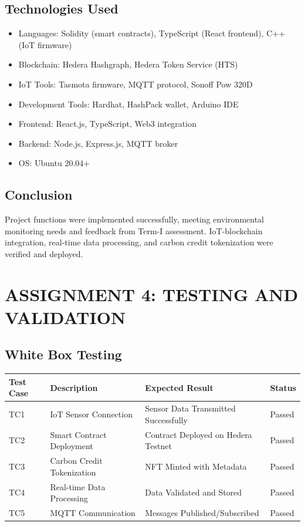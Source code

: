 \documentclass[oneside,a4paper,12pt]{book}
\begin{document}
\begin{appendices}
\subsection{Technologies Used}
\begin{itemize}
    \item Languages: Solidity (smart contracts), TypeScript (React frontend), C++ (IoT firmware)
    \item Blockchain: Hedera Hashgraph, Hedera Token Service (HTS)
    \item IoT Tools: Tasmota firmware, MQTT protocol, Sonoff Pow 320D
    \item Development Tools: Hardhat, HashPack wallet, Arduino IDE
    \item Frontend: React.js, TypeScript, Web3 integration
    \item Backend: Node.js, Express.js, MQTT broker
    \item OS: Ubuntu 20.04+
\end{itemize}

\subsection{Conclusion}
Project functions were implemented successfully, meeting environmental monitoring needs and feedback from Term-I assessment. IoT-blockchain integration, real-time data processing, and carbon credit tokenization were verified and deployed.

\newpage

\section{ASSIGNMENT 4: TESTING AND VALIDATION}

\subsection{White Box Testing}

\begin{longtable}{|p{2cm}|p{4cm}|p{3.5cm}|p{2cm}|}
\hline
\textbf{Test Case} & \textbf{Description} & \textbf{Expected Result} & \textbf{Status} \\
\hline
TC1 & IoT Sensor Connection & Sensor Data Transmitted Successfully & Passed \\
\hline
TC2 & Smart Contract Deployment & Contract Deployed on Hedera Testnet & Passed \\
\hline
TC3 & Carbon Credit Tokenization & NFT Minted with Metadata & Passed \\
\hline
TC4 & Real-time Data Processing & Data Validated and Stored & Passed \\
\hline
TC5 & MQTT Communication & Messages Published/Subscribed & Passed \\
\hline
\end{longtable}


\end{appendices}
\end{document}
